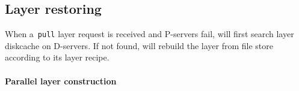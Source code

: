 


\subsection{Layer restoring}
\label{sec:restore-desgin}



When a~\texttt{pull} layer request is received and 
P-servers fail, 
\sysname will first search layer diskcache on D-servers.
If not found,
\sysname will rebuild the layer from file store according to its layer recipe. 

\paragraph{Parallel layer construction}

